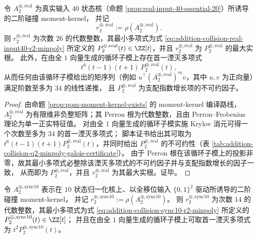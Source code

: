 \begin{theorem}\label{thm:addition-collision-real-input40-q2-minpoly}
令 \(A^{\oplus,\mathrm{real}}_2\) 为真实输入 \(40\) 状态核（命题 \ref{prop:real-input-40-essential-20}）所诱导的二阶碰撞 moment-kernel，
并记
\[
r^{\oplus,\mathrm{real}}_2:=\rho\!\left(A^{\oplus,\mathrm{real}}_2\right).
\]
则 \(r^{\oplus,\mathrm{real}}_2\) 为次数 \(26\) 的代数整数，其最小多项式为式 \ref{eq:addition-collision-real-input40-r2-minpoly} 所定义的
\(P^{\oplus,\mathrm{real}}_2(t)\in\ZZ[t]\)，并且 \(r^{\oplus,\mathrm{real}}_2\) 为 \(P^{\oplus,\mathrm{real}}_2\) 的最大实根。
此外，在由全 \(1\) 向量生成的循环子模上存在首一湮灭多项式
\[
t^{6}(t-1)(t+1)\,P^{\oplus,\mathrm{real}}_2(t),
\]
从而任何由该循环子模给出的矩序列（例如 \(u^{\top}(A^{\oplus,\mathrm{real}}_2)^{m}v\)，其中 \(u,v\) 为正向量）满足阶数至多为 \(34\) 的线性递推，
且 \(P^{\oplus,\mathrm{real}}_2\) 为支配指数增长项的不可约因子。
\end{theorem}

\begin{proof}
由命题 \ref{prop:pom-moment-kernel-exists} 的 moment-kernel 编译路线，
\(A^{\oplus,\mathrm{real}}_2\) 为有限维非负整矩阵；其 Perron 根为代数整数，且由 Perron--Frobenius 理论为单一正实特征值。
对由全 \(1\) 向量生成的循环子模实施 Krylov 消元可得一个次数至多为 \(34\) 的首一湮灭多项式；
脚本证书给出其可取为 \(t^{6}(t-1)(t+1)P^{\oplus,\mathrm{real}}_2(t)\)，并同时给出 \(P^{\oplus,\mathrm{real}}_2\) 的不可约性（表 \ref{tab:addition-collision-q2-minpoly-galois-certificate}）。
由于 Perron 根在该循环子模上的投影非零，故其最小多项式必整除该湮灭多项式的不可约因子并与支配指数增长的因子一致，
从而即为 \(P^{\oplus,\mathrm{real}}_2\)，并且 \(r^{\oplus,\mathrm{real}}_2\) 为其最大实根。证毕。
\end{proof}

\begin{theorem}\label{thm:addition-collision-sync10-q2-minpoly}
令 \(A^{\oplus,\mathrm{sync10}}_2\) 表示在 \(10\) 状态归一化核上、以全移位输入 \(\{0,1\}^2\) 驱动所诱导的二阶碰撞 moment-kernel，
并记 \(r^{\oplus,\mathrm{sync10}}_2:=\rho(A^{\oplus,\mathrm{sync10}}_2)\)。
则 \(r^{\oplus,\mathrm{sync10}}_2\) 为次数 \(14\) 的代数整数，其最小多项式为式 \ref{eq:addition-collision-sync10-r2-minpoly} 所定义的
\(P^{\oplus,\mathrm{sync10}}_2(t)\in\ZZ[t]\)；
并且在由全 \(1\) 向量生成的循环子模上可取首一湮灭多项式为 \(t^{2}P^{\oplus,\mathrm{sync10}}_2(t)\)。
\end{theorem}

